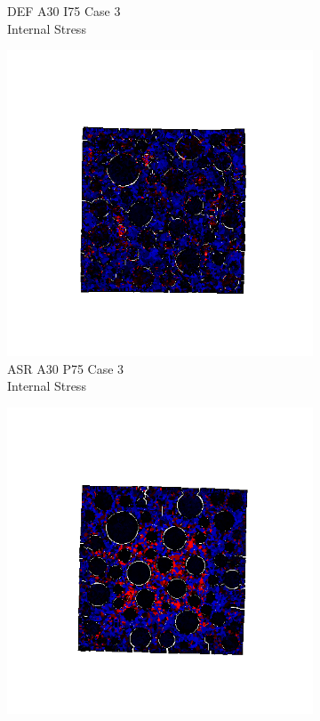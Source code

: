 \begin{figure}[ht!]
\begin{subfigure}{.33\textwidth}
      \caption{DEF A30 I75 Case 3 \\ Internal Stress}
    \end{subfigure}
    \begin{subfigure}{.33\textwidth}
      \centering
      \includegraphics[width=1.0\linewidth]{Files/exp_3D/ASR/A30P75_3_stress.png}
      \caption{ASR A30 P75 Case 3 \\ Internal Stress}
    \end{subfigure}%
    \begin{subfigure}{.33\textwidth}
      \centering
      \includegraphics[width=1.0\linewidth]{Files/exp_3D/DEF/A30X0C_3_stress.png}

\end{subfigure}
\end{figure}
